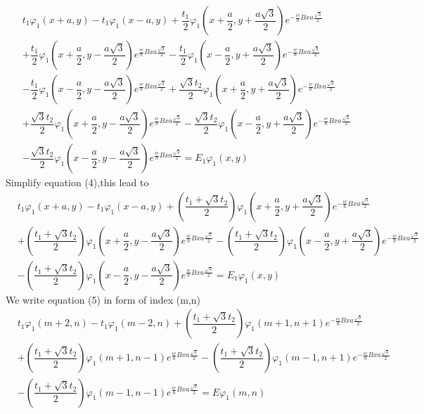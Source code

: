 \documentclass{report}
\newcommand{\f}[2]{\dfrac{#1}{#2}}
\begin{document}
\begin{align*}
	 & t_{1}\varphi_{1}(x+a,y) - t_{1}\varphi_{1}(x-a,y) + \f{t_{1}}{2} \varphi_{1}(x+\f{a}{2},y+\f{a\sqrt{3}}{2}) e^{-\frac{ie}{\hbar} Bxa\frac{\sqrt{3}}{2}}                                                               \\
	 & + \f{t_{1}}{2} \varphi_{1}(x+\f{a}{2},y-\f{a\sqrt{3}}{2}) e^{\frac{ie}{\hbar} Bxa\frac{\sqrt{3}}{2}} - \f{t_{1}}{2} \varphi_{1}(x-\f{a}{2},y+\f{a\sqrt{3}}{2}) e^{-\frac{ie}{\hbar} Bxa\frac{\sqrt{3}}{2}}            \\
	 & - \f{t_{1}}{2} \varphi_{1}(x-\f{a}{2},y-\f{a\sqrt{3}}{2}) e^{\frac{ie}{\hbar} Bxa\frac{\sqrt{3}}{2}} + \f{\sqrt{3}t_{2}}{2}\varphi_{1}(x+\f{a}{2},y+\f{a\sqrt{3}}{2})e^{-\frac{ie}{\hbar} Bxa\frac{\sqrt{3}}{2}}      \\
	 & +\f{\sqrt{3}t_{2}}{2}\varphi_{1}(x+\f{a}{2},y-\f{a\sqrt{3}}{2})e^{\frac{ie}{\hbar} Bxa\frac{\sqrt{3}}{2}} - \f{\sqrt{3}t_{2}}{2}\varphi_{1}(x-\f{a}{2},y+\f{a\sqrt{3}}{2})e^{-\frac{ie}{\hbar} Bxa\frac{\sqrt{3}}{2}} \\
	 & - \f{\sqrt{3}t_{2}}{2}\varphi_{1}(x-\f{a}{2},y-\f{a\sqrt{3}}{2})e^{\frac{ie}{\hbar} Bxa\frac{\sqrt{3}}{2}} = E_{1}\varphi_{1}(x,y) \tag{4}
\end{align*}
Simplify equation (4),this lead to
\begin{align*}
	 & t_{1}\varphi_{1}(x+a,y) - t_{1}\varphi_{1}(x-a,y)
	+ \left(\f{t_{1} + \sqrt{3}t_{2}}{2}\right)\varphi_{1}(x+\f{a}{2},y+\f{a\sqrt{3}}{2}) e^{-\frac{ie}{\hbar} Bxa\frac{\sqrt{3}}{2}}                                    \\
	 & + \left(\f{t_{1} + \sqrt{3}t_{2}}{2}\right)\varphi_{1}(x+\f{a}{2},y-\f{a\sqrt{3}}{2}) e^{\frac{ie}{\hbar} Bxa\frac{\sqrt{3}}{2}}
	- \left(\f{t_{1} + \sqrt{3}t_{2}}{2}\right)\varphi_{1}(x-\f{a}{2},y+\f{a\sqrt{3}}{2}) e^{-\frac{ie}{\hbar} Bxa\frac{\sqrt{3}}{2}}                                    \\
	 & - \left(\f{t_{1} + \sqrt{3}t_{2}}{2}\right)\varphi_{1}(x-\f{a}{2},y-\f{a\sqrt{3}}{2}) e^{\frac{ie}{\hbar} Bxa\frac{\sqrt{3}}{2}} =  E_{1}\varphi_{1}(x,y) \tag{5}
\end{align*}
We write equation (5) in form of index (m,n)
\begin{align*}
	 & t_{1}\varphi_{1}(m+2,n) - t_{1}\varphi_{1}(m-2,n)
	+ \left(\f{t_{1} + \sqrt{3}t_{2}}{2}\right)\varphi_{1}(m+1,n+1) e^{-\frac{ie}{\hbar} Bxa\frac{\sqrt{3}}{2}}                                \\
	 & + \left(\f{t_{1} + \sqrt{3}t_{2}}{2}\right)\varphi_{1}(m+1,n-1) e^{\frac{ie}{\hbar} Bxa\frac{\sqrt{3}}{2}}
	- \left(\f{t_{1} + \sqrt{3}t_{2}}{2}\right)\varphi_{1}(m-1,n+1) e^{-\frac{ie}{\hbar} Bxa\frac{\sqrt{3}}{2}}                                \\
	 & - \left(\f{t_{1} + \sqrt{3}t_{2}}{2}\right)\varphi_{1}(m-1,n-1) e^{\frac{ie}{\hbar} Bxa\frac{\sqrt{3}}{2}} =  E\varphi_{1}(m,n) \tag{6}
\end{align*}
\end{document}

